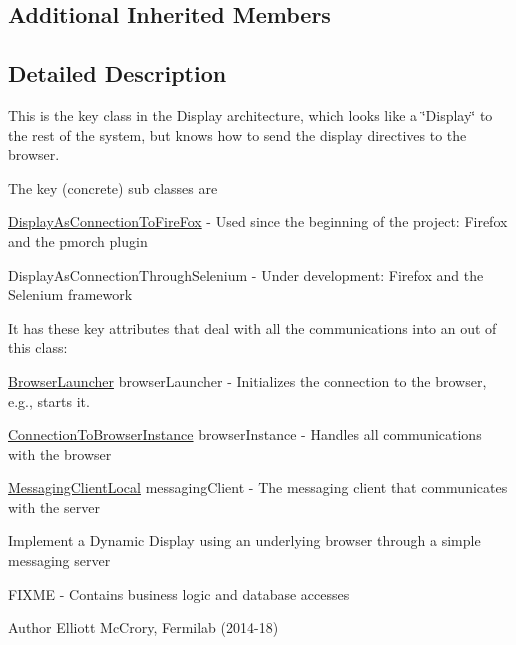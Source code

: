 \subsection*{Additional Inherited Members}


\subsection{Detailed Description}
This is the key class in the Display architecture, which looks like a \char`\"{}\-Display\char`\"{} to the rest of the system, but knows how to send the display directives to the browser. 

The key (concrete) sub classes are 
\begin{DoxyItemize}
\item \hyperlink{classgov_1_1fnal_1_1ppd_1_1dd_1_1display_1_1client_1_1DisplayAsConnectionToFireFox}{Display\-As\-Connection\-To\-Fire\-Fox} -\/ Used since the beginning of the project\-: Firefox and the pmorch plugin 
\item Display\-As\-Connection\-Through\-Selenium -\/ Under development\-: Firefox and the Selenium framework 





It has these key attributes that deal with all the communications into an out of this class\-: 
\begin{DoxyEnumerate}
\item \hyperlink{classgov_1_1fnal_1_1ppd_1_1dd_1_1display_1_1client_1_1BrowserLauncher}{Browser\-Launcher} browser\-Launcher -\/ Initializes the connection to the browser, e.\-g., starts it. 
\item \hyperlink{classgov_1_1fnal_1_1ppd_1_1dd_1_1display_1_1client_1_1ConnectionToBrowserInstance}{Connection\-To\-Browser\-Instance} browser\-Instance -\/ Handles all communications with the browser 
\item \hyperlink{classgov_1_1fnal_1_1ppd_1_1dd_1_1display_1_1client_1_1DisplayControllerMessagingAbstract_1_1MessagingClientLocal}{Messaging\-Client\-Local} messaging\-Client -\/ The messaging client that communicates with the server 
\end{DoxyEnumerate}



Implement a Dynamic Display using an underlying browser through a simple messaging server

F\-I\-X\-M\-E -\/ Contains business logic and database accesses

\begin{DoxyAuthor}{Author}
Elliott Mc\-Crory, Fermilab (2014-\/18) 
\end{DoxyAuthor}

\end{DoxyItemize}


